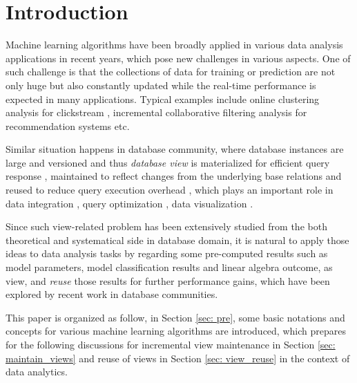 \section{Introduction}

Machine learning algorithms have been broadly applied in various data analysis applications in recent years, which pose new challenges in various aspects. One of such challenge is that the collections of data for training or prediction are not only huge but also constantly updated while the real-time performance is expected in many applications. Typical examples include online clustering analysis for clickstream \cite{guha2000clustering}, incremental collaborative filtering analysis for recommendation systems \cite{papagelis2005incremental} etc. 

Similar situation happens in database community, where database instances are large and versioned and thus {\em database view} is materialized for efficient query response \cite{date2006relational}, maintained to reflect changes from the underlying base relations \cite{gupta1993maintaining, green2007update} and reused to reduce query execution overhead \cite{halevy2001answering}, which plays an important role in data integration \cite{levy1996querying}, query optimization \cite{rajaraman1995answering}, data visualization \cite{brachman1993integrated}. 

Since such view-related problem has been extensively studied from the both theoretical and systematical side in database domain,  it is natural to apply those ideas to data analysis tasks by regarding some pre-computed results such as model parameters, model classification results and linear algebra outcome, as view, and {\em reuse} those results for further performance gains, which have been explored by recent work in database communities. 

This paper is organized as follow, in Section \ref{sec: pre}, some basic notations and concepts for various machine learning algorithms are introduced, which prepares for the following discussions for incremental view maintenance in Section \ref{sec: maintain_views} and reuse of views in Section \ref{sec: view_reuse} in the context of data analytics.